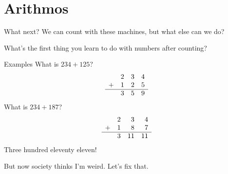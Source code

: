 \section{Arithmos}
\begin{namedframe}{What next?}
	We can count with these machines, but what else can we do?

	\pause
	What's the first thing you learn to do with numbers after counting?
\end{namedframe}
\begin{namedframe}{Examples}
	What is $234 + 125$?
	\pause
	\begin{equation*}
		\begin{array}{rrrr}
			  & 2 & 3 & 4\\
			+ & 1 & 2 & 5\\\hline
			  & 3 & 5 & 9
		\end{array}
	\end{equation*}
	\pause
	What is $234 + 187$?
	\pause
	\begin{equation*}
		\begin{array}{rrrr}
			  & 2 & 3  & 4\\
			+ & 1 & 8  & 7\\\hline
			  & 3 & 11 & 11
		\end{array}
	\end{equation*}
	\pause
	Three hundred eleventy eleven!

	But now society thinks I'm weird. Let's fix that.
\end{namedframe}
